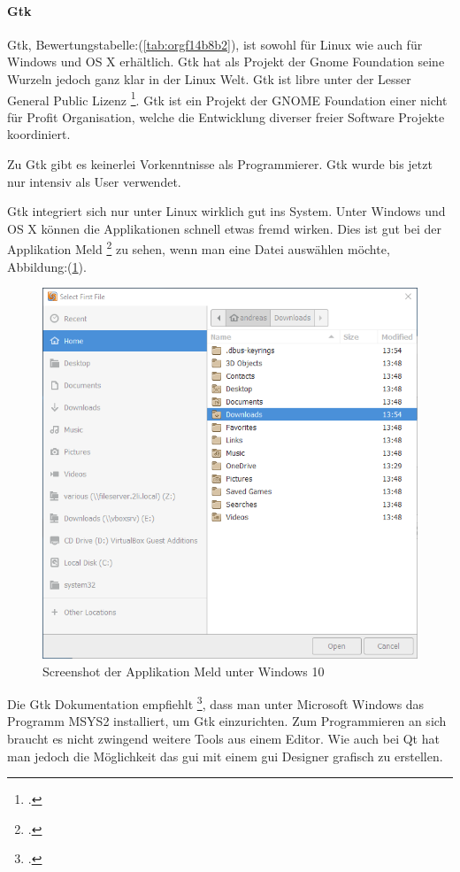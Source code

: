 \paragraph{Gtk}
\label{sec:orgbac0846}

Gtk, Bewertungstabelle:(\ref{tab:orgf14b8b2}), ist sowohl für Linux wie auch
für Windows und OS X erhältlich. Gtk hat als Projekt der Gnome Foundation seine
Wurzeln jedoch ganz klar in der Linux Welt. Gtk ist \gls{libre} unter der
Lesser General Public Lizenz \footcite{gtklicense}. Gtk ist ein Projekt der
GNOME Foundation einer nicht für Profit Organisation, welche die Entwicklung
diverser freier Software Projekte koordiniert.

Zu Gtk gibt es keinerlei Vorkenntnisse als Programmierer. Gtk wurde bis jetzt
nur intensiv als User verwendet.

Gtk integriert sich nur unter Linux wirklich gut ins System. Unter Windows und
OS X können die Applikationen schnell etwas fremd wirken. Dies ist gut bei der
Applikation Meld \footcite{meld} zu sehen, wenn man eine Datei auswählen möchte,
Abbildung:(\ref{fig:org7ef2fd3}).

\begin{figure}[H]
\centering
\includegraphics[width=.7\linewidth]{pictures/meld.png}
\caption{\label{fig:org7ef2fd3}
Screenshot der Applikation Meld unter Windows 10}
\end{figure}
Die Gtk Dokumentation empfiehlt \footcite{gtk_setup}, dass man unter Microsoft
Windows das Programm MSYS2 installiert, um Gtk einzurichten. Zum Programmieren
an sich braucht es nicht zwingend weitere Tools aus einem Editor. Wie auch bei
Qt hat man jedoch die Möglichkeit das \gls{gui} mit einem \gls{gui} Designer
grafisch zu erstellen.

